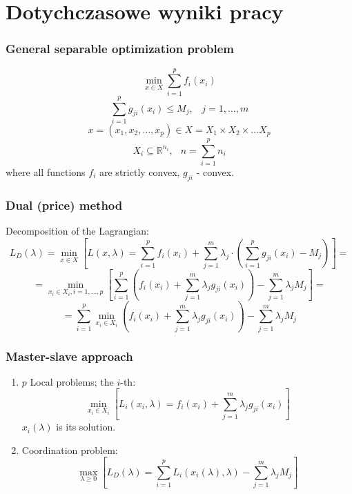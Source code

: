 \documentclass{beamer}
\def\Rset{\mathbb{R}}
\newcommand{\beq}{\begin{equation}}
\newcommand{\eeq}{\end{equation}}
\begin{document}
\section{Dotychczasowe wyniki pracy}

\begin{frame}
   \frametitle{General separable optimization problem}
   \beq
   \min_{x \in X} \sum_{i=1}^p f_i(x_i)
   \label{zad.sep.wj}
   \eeq
   \beq
   \sum_{i=1}^p g_{ji}(x_i) \leq M_j, \;\;\;  j=1,\ldots,m
   \eeq
   \beq
   x =(x_1,x_2,\ldots,x_p) \in
   X=X_1 \times X_2 \times \ldots X_p
   \eeq
   \beq X_i \subseteq \Rset^{n_i},\;\;\, n=\sum_{i=1}^p n_i
   \label{zad.sep.kon}
   \eeq
   where all  functions $f_i$ are strictly convex, $g_{ji}$ - convex.
\end{frame}

\begin{frame}
   \frametitle{Dual (price) method}
   Decomposition of the Lagrangian:
   \[
      L_D(\lambda) = \min_{x \in X} \left[ L(x,\lambda) =
         \sum_{i=1}^p f_i(x_i) + \sum_{j=1}^m \lambda_j \cdot \left( \sum_{i=1}^p g_{ji}(x_i) -
         M_j \right) \right]
      =
   \]
   \[
      = \min_{x_i \in
         X_i , i=1,\ldots,p} \left[ \sum_{i=1}^p \left(f_i(x_i) +
         \sum_{j=1}^m \lambda_j  g_{ji}(x_i) \right) - \sum_{j=1}^m \lambda_j
         M_j \right] =
   \]
   \beq
   =\sum_{i=1}^p \min_{x_i \in X_i} \left( f_i(x_i) +
   \sum_{j=1}^m \lambda_j  g_{ji}(x_i) \right) - \sum_{j=1}^m \lambda_j
   M_j
   \label{f.dualna}
   \eeq
\end{frame}

\begin{frame}
   \frametitle{Master-slave approach}
   \begin{enumerate}
      \item $p$ Local problems; the $i$-th:
            \beq
            \min_{x_i \in X_i} \left[ L_i(x_i,\lambda)=f_i(x_i) + \sum_{j=1}^m \lambda_j  g_{ji}(x_i)\right]
            \eeq
            \hspace{1cm}$x_i(\lambda)$  is its solution.
      \item Coordination problem:
            \beq
            \max_{\lambda \geq 0} \left[ L_D(\lambda)= \sum_{i=1}^p L_i(x_i(\lambda),\lambda)
               - \sum_{j=1}^m   \lambda_j M_j \right]
            \eeq
   \end{enumerate}
\end{frame}
\end{document}
